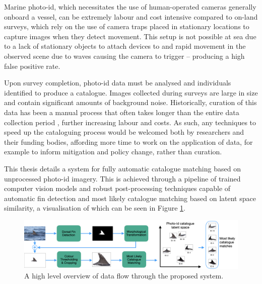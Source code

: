 Marine photo-id, which necessitates the use of human-operated cameras generally onboard a vessel, can be extremely labour and cost intensive compared to on-land surveys, which rely on the use of camera traps placed in stationary locations to capture images when they detect movement. This setup is not possible at sea due to a lack of stationary objects to attach devices to and rapid movement in the observed scene due to waves causing the camera to trigger -- producing a high false positive rate. 

Upon survey completion, photo-id data must be analysed and individuals identified to produce a catalogue. Images collected during surveys are large in size and contain significant amounts of background noise. Historically, curation of this data has been a manual process that often takes longer than the entire data collection period \cite{tyson_moore_rise_2022}, further increasing labour and costs. As such, any techniques to speed up the cataloguing process would be welcomed both by researchers and their funding bodies, affording more time to work on the application of data, for example to inform mitigation and policy change, rather than curation. 

This thesis details a system for fully automatic catalogue matching based on unprocessed photo-id imagery. This is achieved through a pipeline of trained computer vision models and robust post-processing techniques capable of automatic fin detection and most likely catalogue matching based on latent space similarity, a visualisation of which can be seen in Figure \ref{fig:pipeline}. 

\begin{figure}[b]
	\begin{center}
		\includegraphics[width=\linewidth]{Chapter1/figs/pipeline_compact.png}
	\end{center}
	\caption{A high level overview of data flow through the proposed system.}
	\label{fig:pipeline}
\end{figure}

